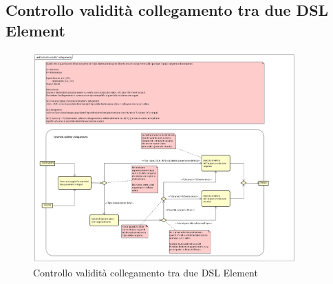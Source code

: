     \subsection{Controllo validità collegamento tra due DSL Element}
    \begin{figure}[H]
      \centering
      \includegraphics[width=0.9\textwidth]{res/img/controlloCollegamento.png}
      \caption{Controllo validità collegamento tra due DSL Element}
      \label{fig:diagram_model}
    \end{figure}
